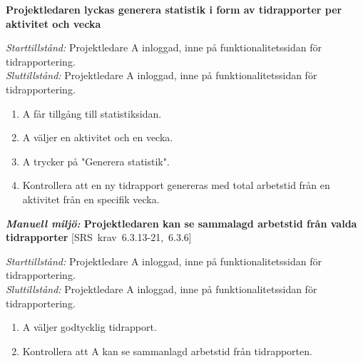 \documentclass[a4paper]{article}
\def\reqinside{\hfil\penalty 100 \hfilneg \hbox}
\def \req [#1]{\reqinside{[SRS krav #1]}}
\begin{document}
\begin{FT}
\item
\textbf{Projektledaren lyckas generera statistik i form av tidrapporter per aktivitet och vecka}

\emph{Starttillstånd:} Projektledare A inloggad, inne på funktionalitetssidan för tidrapportering.\\
\emph{Sluttillstånd:} Projektledare A inloggad, inne på funktionalitetssidan för tidrapportering.

\begin{enumerate}
\item A får tillgång till statistiksidan.
\item A väljer en aktivitet och en vecka.
\item A trycker på "Generera statistik".
\item Kontrollera att en ny tidrapport genereras med total arbetstid från en aktivitet från en specifik vecka.
\end{enumerate}


\item
\textbf{\emph{Manuell miljö:} Projektledaren kan se sammalagd arbetstid från valda tidrapporter} \req[6.3.13-21, 6.3.6]

\emph{Starttillstånd:} Projektledare A inloggad, inne på funktionalitetssidan för tidrapportering.\\
\emph{Sluttillstånd:} Projektledare A inloggad, inne på funktionalitetssidan för tidrapportering.

\begin{enumerate}
\item A väljer godtycklig tidrapport.
\item Kontrollera att A kan se sammanlagd arbetstid från tidrapporten.
\end{enumerate}





\end{FT}
\end{document}
